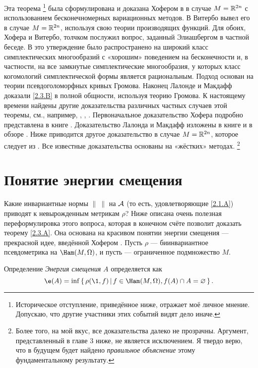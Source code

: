 Эта теорема%
\footnote{Историческое отступление, приведённое ниже, отражает моё личное мнение.
Допускаю, что другие участники этих событий видят дело иначе.}
была сформулирована и доказана Хофером в \cite{H1} в случае $M = \mathbb{R}^{2n}$ с использованием бесконечномерных вариационных методов.
В \cite{V1} Витербо вывел его в случае $M = \mathbb{R}^{2n}$, используя свою теории производящих функций.
Для обоих, Хофера и Витербо, толчком послужил вопрос, заданный Элиашбергом в частной беседе.
В \cite{P1} это утверждение было распространено на широкий класс симплектических многообразий с «хорошим» поведением на бесконечности и, в частности, на все замкнутые симплектические многообразия, у которых класс когомологий симплектической формы является рациональным.
Подход \cite{P1} основан на теории псевдоголоморфных кривых Громова.
Наконец \cite{LM1} Лалонде и Макдафф доказали \ref{2.3.B} в полной общности, используя теорию Громова.
К настоящему времени найдены другие доказательства различных частных случаев этой теоремы, см., например, \cite{Ch}, \cite{O3}, \cite{Sch3}.
Первоначальное доказательство Хофера подробно представлена в книге
\cite{HZ}.
Доказательство Лалонда и Макдафф изложены в книге \cite{MS} и в обзоре \cite{L}.
Ниже приводится другое доказательство в случае $M = \mathbb{R}^{2n}$, которое следует из \cite{P1}.
Все известные доказательства основаны на «жёстких» методах.%
\footnote{Более того, на мой вкус, все доказательства далеко не прозрачны.
Аргумент, представленный в главе 3 ниже, не является исключением.
Я твердо верю, что в будущем будет найдено {}\emph{правильное объяснение} этому фундаментальному результату.}

\section{Понятие энергии смещения}\label{sec:2.4}

Какие инвариантные нормы $\|\ \|$ на $\mathcal{A}$ (то есть, удовлетворяющие \ref{2.1.A}) приводят к невырожденным метрикам $\rho$?
Ниже описана очень полезная переформулировка этого вопроса, которая в конечном счёте позволит доказать теорему \ref{2.3.A}.
Она основана на красивом понятии энергии смещения --- прекрасной идее, введённой Хофером \cite{H1}.
Пусть $\rho$ --- биинвариантное псевдометрика на $\Ham (M, \Omega)$, и пусть  --- ограниченное подмножество $M$.

\begin{ex*}{Определение}
\emph{Энергия смещения} $A$ определяется как 
\[\e(A) = \inf \set{\rho (\1, f)}{f \in \Ham (M, \Omega), f (A) \cap A = \emptyset}.\]
\end{ex*}

